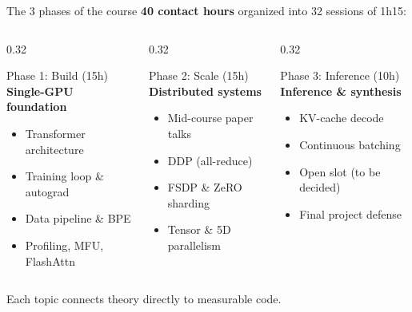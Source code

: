 \documentclass[handout]{beamer}
\begin{document}
\begin{frame}{The 3 phases of the course}
  \textbf{40 contact hours} organized into 32 sessions of 1h15:
  \begin{columns}[t]
    \begin{column}{0.32\linewidth}
      \begin{block}{Phase 1: Build (15h)}
        \footnotesize
        \textbf{Single-GPU foundation}
        \begin{itemize}
            \setlength{\itemsep}{1pt}
          \item Transformer architecture
          \item Training loop \& autograd
          \item Data pipeline \& BPE
          \item Profiling, MFU, FlashAttn
        \end{itemize}
      \end{block}
    \end{column}
    \begin{column}{0.32\linewidth}
      \begin{block}{Phase 2: Scale (15h)}
        \footnotesize
        \textbf{Distributed systems}
        \begin{itemize}
            \setlength{\itemsep}{1pt}
          \item Mid-course paper talks
          \item DDP (all-reduce)
          \item FSDP \& ZeRO sharding
          \item Tensor \& 5D parallelism
        \end{itemize}
      \end{block}
    \end{column}
    \begin{column}{0.32\linewidth}
      \begin{block}{Phase 3: Inference (10h)}
        \footnotesize
        \textbf{Inference \& synthesis}
        \begin{itemize}
            \setlength{\itemsep}{1pt}
          \item KV-cache decode
          \item Continuous batching
          \item Open slot (to be decided)
          \item Final project defense
        \end{itemize}
      \end{block}
    \end{column}
  \end{columns}
  \vspace{3pt}
  \centering\small Each topic connects theory directly to measurable code.
\end{frame}
\end{document}
